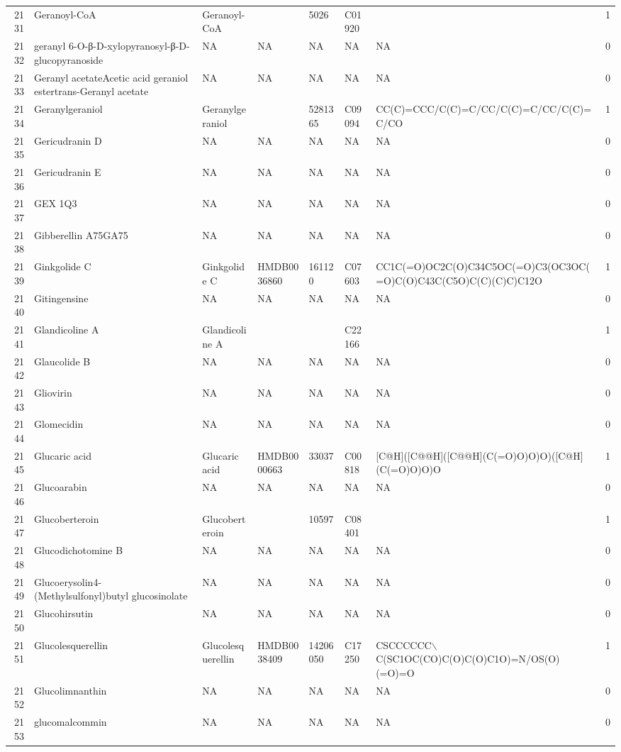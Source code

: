 \documentclass[a4paper]{article}
\begin{document}
\begin{longtable}{rlllllll}
  2131 & Geranoyl-CoA & Geranoyl-CoA &  & 5026 & C01920 &  & 1 \\ 
  2132 & geranyl 6-O-β-D-xylopyranosyl-β-D-glucopyranoside & NA & NA & NA & NA & NA & 0 \\ 
  2133 & Geranyl acetateAcetic acid geraniol estertrans-Geranyl acetate & NA & NA & NA & NA & NA & 0 \\ 
  2134 & Geranylgeraniol & Geranylgeraniol &  & 5281365 & C09094 & CC(C)=CCC/C(C)=C/CC/C(C)=C/CC/C(C)=C/CO & 1 \\ 
  2135 & Gericudranin D & NA & NA & NA & NA & NA & 0 \\ 
  2136 & Gericudranin E & NA & NA & NA & NA & NA & 0 \\ 
  2137 & GEX 1Q3 & NA & NA & NA & NA & NA & 0 \\ 
  2138 & Gibberellin A75GA75 & NA & NA & NA & NA & NA & 0 \\ 
  2139 & Ginkgolide C & Ginkgolide C & HMDB0036860 & 161120 & C07603 & CC1C(=O)OC2C(O)C34C5OC(=O)C3(OC3OC(=O)C(O)C43C(C5O)C(C)(C)C)C12O & 1 \\ 
  2140 & Gitingensine & NA & NA & NA & NA & NA & 0 \\ 
  2141 & Glandicoline A & Glandicoline A &  &  & C22166 &  & 1 \\ 
  2142 & Glaucolide B & NA & NA & NA & NA & NA & 0 \\ 
  2143 & Gliovirin & NA & NA & NA & NA & NA & 0 \\ 
  2144 & Glomecidin & NA & NA & NA & NA & NA & 0 \\ 
  2145 & Glucaric acid & Glucaric acid & HMDB0000663 & 33037 & C00818 & [C@H]([C@@H]([C@@H](C(=O)O)O)O)([C@H](C(=O)O)O)O & 1 \\ 
  2146 & Glucoarabin & NA & NA & NA & NA & NA & 0 \\ 
  2147 & Glucoberteroin & Glucoberteroin &  & 10597 & C08401 &  & 1 \\ 
  2148 & Glucodichotomine B & NA & NA & NA & NA & NA & 0 \\ 
  2149 & Glucoerysolin4-(Methylsulfonyl)butyl glucosinolate & NA & NA & NA & NA & NA & 0 \\ 
  2150 & Glucohirsutin & NA & NA & NA & NA & NA & 0 \\ 
  2151 & Glucolesquerellin & Glucolesquerellin & HMDB0038409 & 14206050 & C17250 & CSCCCCCC$\backslash$C(SC1OC(CO)C(O)C(O)C1O)=N/OS(O)(=O)=O & 1 \\ 
  2152 & Glucolimnanthin & NA & NA & NA & NA & NA & 0 \\ 
  2153 & glucomalcommin & NA & NA & NA & NA & NA & 0 \\ 

\end{longtable}
\end{document}
